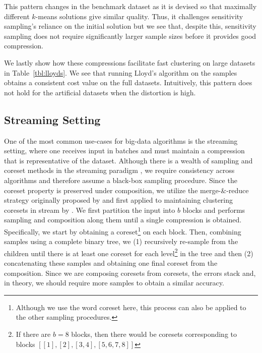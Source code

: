 This pattern changes in the benchmark dataset as it is devised so that maximally different $k$-means solutions give similar quality. Thus, it challenges
sensitivity sampling's reliance on the initial solution but we see that, despite this, sensitivity sampling does not require significantly larger sample sizes
before it provides good compression.

We lastly show how these compressions facilitate fast clustering on large datasets in Table~\ref{tbl:lloyds}. We see that running Lloyd's algorithm on
the samples obtains a consistent cost value on the full datasets. Intuitively, this pattern does not hold for the artificial datasets when the distortion is
high.




\subsection{Streaming Setting}
\label{ssec:streaming}

One of the most common use-cases for big-data algorithms is the streaming setting, where one receives input in batches and must maintain a compression that is
representative of the dataset. Although there is a wealth of sampling and coreset methods in the streaming paradigm , we require consistency
across algorithms and therefore assume a black-box sampling procedure. Since the coreset property is preserved under composition, we utilize the merge-\&-reduce
strategy originally proposed by \cite{BS80} and first applied to maintaining clustering coresets in stream by \cite{HaM01}. We first partition the input into $b$ blocks and performs sampling and composition along them until a single compression
is obtained. Specifically, we start by obtaining a coreset\footnote{Although we use the word coreset here, this process can also be applied to the other
sampling procedures.} on each block. Then, combining samples using a complete binary tree, we (1) recursively re-sample from the children until there is at
least one coreset for each level\footnote{If there are $b=8$ blocks, then there would be coresets corresponding to blocks $[[1], [2], [3, 4], [5, 6, 7, 8]]$} in the
tree and then (2) concatenating these samples and obtaining one final coreset from the composition. Since we are composing coresets from coresets, the errors
stack and, in theory, we should require more samples to obtain a similar accuracy. 

